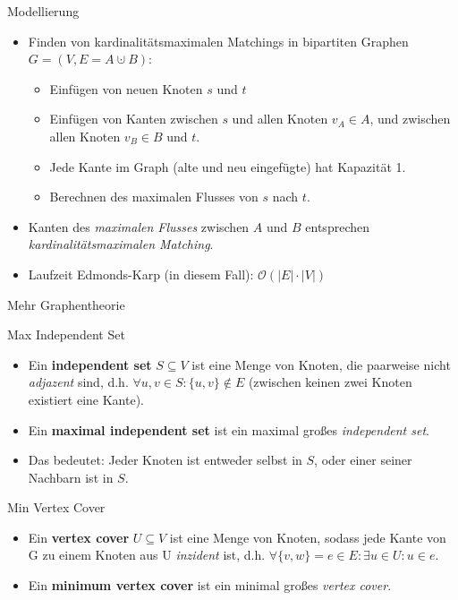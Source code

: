 \documentclass[18pt]{beamer}
\begin{document}
\begin{frame}{Modellierung}
\begin{itemize}
\item Finden von kardinalit\"atsmaximalen Matchings in bipartiten Graphen $G = (V, E = A \cupdot B)$:
\begin{itemize}
	\item Einf\"ugen von neuen Knoten $s$ und $t$
	\item Einf\"ugen von Kanten zwischen $s$ und allen Knoten $v_{A} \in A$, und zwischen allen Knoten $v_{B} \in B$ und $t$.
	\item Jede Kante im Graph (alte und neu eingef\"ugte) hat Kapazit\"at 1.
	\item Berechnen des maximalen Flusses von $s$ nach $t$.
\end{itemize}
\item Kanten des \textit{maximalen Flusses} zwischen $A$ und $B$ entsprechen \textit{kardinalit\"atsmaximalen Matching}.
\item Laufzeit Edmonds-Karp (in diesem Fall): $\mathcal{O}(|E| \cdot |V|)$
\end{itemize}
\end{frame}

\begin{frame}{Mehr Graphentheorie}
\begin{block}{Max Independent Set}
\begin{itemize}
\item Ein \textbf{independent set} $S \subseteq V$ ist eine Menge von Knoten, die paarweise nicht \textit{adjazent} sind,
d.h. $\forall u, v \in S: \{u, v\} \notin E$ (zwischen keinen zwei Knoten existiert eine Kante).
\item Ein \textbf{maximal independent set} ist ein maximal gro{\ss}es \textit{independent set}.
\item Das bedeutet: Jeder Knoten ist entweder selbst in $S$, oder einer seiner Nachbarn ist in $S$.
\end{itemize}
\end{block}

\pause

\begin{block}{Min Vertex Cover}
\begin{itemize}
\item Ein \textbf{vertex cover} $U \subseteq V$ ist eine Menge von Knoten, sodass jede Kante von G zu einem Knoten aus U \textit{inzident} ist,
d.h. $\forall \{v, w\} = e \in E: \exists u \in U: u \in e$.
\item Ein \textbf{minimum vertex cover} ist ein minimal gro{\ss}es \textit{vertex cover}.
\end{itemize}
\end{block}
\end{frame}
\end{document}
